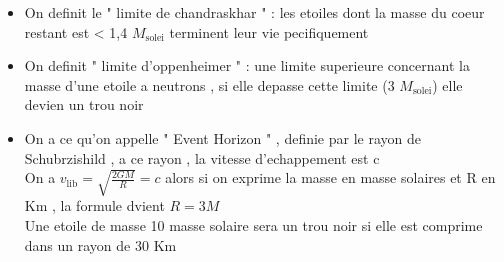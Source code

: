 \documentclass[12pt]{book}
\begin{document}
\begin{itemize}
\begin{itemize}
            \item On definit le " limite de chandraskhar " : les etoiles dont la masse du coeur restant est < 1,4 $ M_\text{solei} $ terminent leur vie pecifiquement 
            \item On definit " limite d'oppenheimer " : une limite superieure concernant la masse d'une etoile a neutrons , si elle depasse cette limite (3 $ M_\text{solei} $) elle devien un trou noir   
            \item On a ce qu'on appelle " Event Horizon " , definie par le rayon de Schubrzishild , a ce rayon , la vitesse d'echappement est c\\
                 On a $ v_\text{lib} = \sqrt{\frac{2GM}{R}}= c $ alors si on exprime la masse en masse solaires et R en Km , la formule dvient $ R=3M $\\
                 Une etoile de masse 10 masse solaire sera un trou noir si elle est comprime dans un rayon de 30 Km 
        \end{itemize}
      \end{itemize}




        
        
\end{document}
